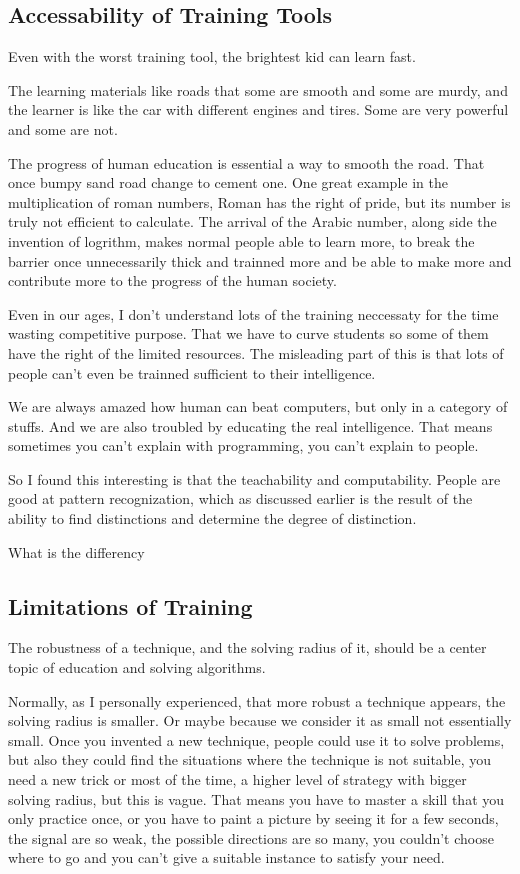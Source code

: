 \subsection{Accessability of Training Tools}

Even with the worst training tool, the brightest kid can learn fast.

The learning materials like roads that some are smooth and some are murdy, and the learner is like the car with different engines and tires. Some are very powerful and some are not.

The progress of human education is essential a way to smooth the road. That once bumpy sand road change to cement one. One great example in the multiplication of roman numbers, Roman has the right of pride, but its number is truly not efficient to calculate. The arrival of the Arabic number, along side the invention of logrithm, makes normal people able to learn more, to break the barrier once unnecessarily thick and trainned more and be able to make more and contribute more to the progress of the human society.

Even in our ages, I don't understand lots of the training neccessaty for the time wasting competitive purpose. That we have to curve students so some of them have the right of the limited resources. The misleading part of this is that lots of people can't even be trainned sufficient to their intelligence.

We are always amazed how human can beat computers, but only in a category of stuffs. And we are also troubled by educating the real intelligence. That means sometimes you can't explain with programming, you can't explain to people.

So I found this interesting is that the teachability and computability. People are good at pattern recognization, which as discussed earlier is the result of the ability to find distinctions and determine the degree of distinction.

What is the differency

\subsection{Limitations of Training}

The robustness of a technique, and the solving radius of it, should be a center topic of education and solving algorithms.

Normally, as I personally experienced, that more robust a technique appears, the solving radius is smaller. Or maybe because we consider it as small not essentially small. Once you invented a new technique, people could use it to solve problems, but also they could find the situations where the technique is not suitable, you need a new trick or most of the time, a higher level of strategy with bigger solving radius, but this is vague. That means you have to master a skill that you only practice once, or you have to paint a picture by seeing it for a few seconds, the signal are so weak, the possible directions are so many, you couldn't choose where to go and you can't give a suitable instance to satisfy your need.

